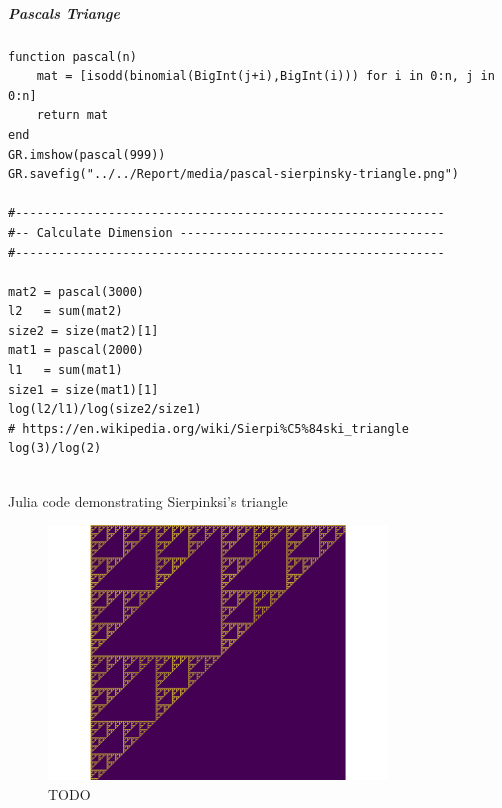 \documentclass[11pt]{article}
\begin{document}
\subparagraph{Pascals Triange}
\label{sec:org1ce8b33}

\begin{listing}[htbp]
\begin{verbatim}
function pascal(n)
    mat = [isodd(binomial(BigInt(j+i),BigInt(i))) for i in 0:n, j in 0:n]
    return mat
end
GR.imshow(pascal(999))
GR.savefig("../../Report/media/pascal-sierpinsky-triangle.png")

#------------------------------------------------------------
#-- Calculate Dimension -------------------------------------
#------------------------------------------------------------

mat2 = pascal(3000)
l2   = sum(mat2)
size2 = size(mat2)[1]
mat1 = pascal(2000)
l1   = sum(mat1)
size1 = size(mat1)[1]
log(l2/l1)/log(size2/size1)
# https://en.wikipedia.org/wiki/Sierpi%C5%84ski_triangle
log(3)/log(2)


\end{verbatim}
\caption{\label{pascal-triangle-sierpinski}Julia code demonstrating Sierpinksi's triangle}
\end{listing}

\begin{figure}[htbp]
\centering
\includegraphics[width=9cm]{media/pascal-sierpinsky-triangle.png}
\caption{\label{fig:pascal-sierpinsky}TODO}
\end{figure}
\end{document}
